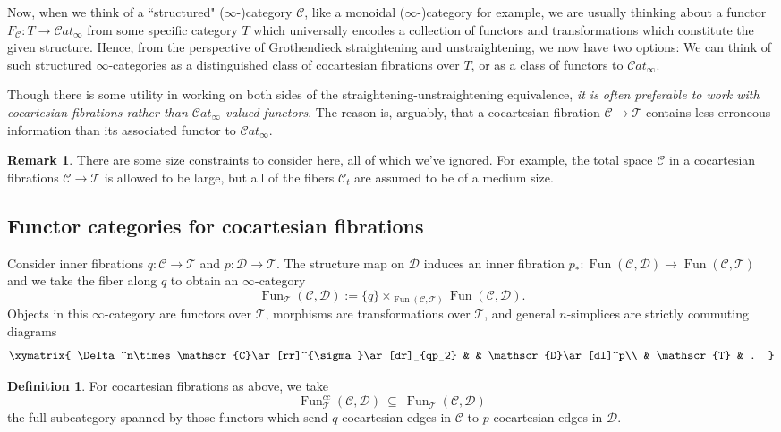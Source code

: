 \documentclass[reqno]{amsart}
\theoremstyle{definition}
\newtheorem{definition}[lemma]{Definition}
\newtheorem{remark}[lemma]{Remark}
\newcommand{\msc}[1]{\mathscr{#1}}
\newcommand{\sCat}{\msc{C}\!at}
\DeclareMathOperator{\Fun}{Fun}
\renewcommand{\1}{\mathbf{1}}
\begin{document}
Now, when we think of a ``structured" ($\infty$-)category $\msc{C}$, like a monoidal ($\infty$-)category for example, we are usually thinking about a functor $F_{\msc{C}}:T\to \sCat_{\infty}$ from some specific category $T$ which universally encodes a collection of functors and transformations which constitute the given structure.  Hence, from the perspective of Grothendieck straightening and unstraightening, we now have two options: We can think of such structured $\infty$-categories as a distinguished class of cocartesian fibrations over $T$, or as a class of functors to $\sCat_{\infty}$.
\par

Though there is some utility in working on both sides of the straightening-unstraightening equivalence, {\it it is often preferable to work with cocartesian fibrations rather than $\sCat_{\infty}$-valued functors}. The reason is, arguably, that a cocartesian fibration $\msc{C}\to \msc{T}$ contains less erroneous information than its associated functor to $\sCat_{\infty}$.

\begin{remark}
There are some size constraints to consider here, all of which we've ignored.  For example, the total space $\msc{C}$ in a cocartesian fibrations $\msc{C}\to \msc{T}$ is allowed to be large, but all of the fibers $\msc{C}_t$ are assumed to be of a medium size.
\end{remark}

\subsection{Functor categories for cocartesian fibrations}
\label{sect:fun_cc}

Consider inner fibrations $q:\msc{C}\to \msc{T}$ and $p:\msc{D}\to \msc{T}$.  The structure map on $\msc{D}$ induces an inner fibration $p_\ast:\Fun(\msc{C},\msc{D})\to \Fun(\msc{C},\msc{T})$ \cite[\href{https://kerodon.net/tag/01BV}{01BV}]{kerodon} and we take the fiber along $q$ to obtain an $\infty$-category
\[
\Fun_{\msc{T}}(\msc{C},\msc{D}):= \{q\}\times_{\Fun(\msc{C},\msc{T})}\Fun(\msc{C},\msc{D}).
\]
Objects in this $\infty$-category are functors over $\msc{T}$, morphisms are transformations over $\msc{T}$, and general $n$-simplices are strictly commuting diagrams
\[
\xymatrix{
\Delta^n\times \msc{C}\ar[rr]^{\sigma}\ar[dr]_{qp_2} & & \msc{D}\ar[dl]^p\\
	& \msc{T} & .
}
\]

\begin{definition}
For cocartesian fibrations as above, we take
\[
\Fun^{cc}_{\msc{T}}(\msc{C},\msc{D})\ \subseteq\ \Fun_{\msc{T}}(\msc{C},\msc{D})
\]
the full subcategory spanned by those functors which send $q$-cocartesian edges in $\msc{C}$ to $p$-cocartesian edges in $\msc{D}$.
\end{definition}
\end{document}
